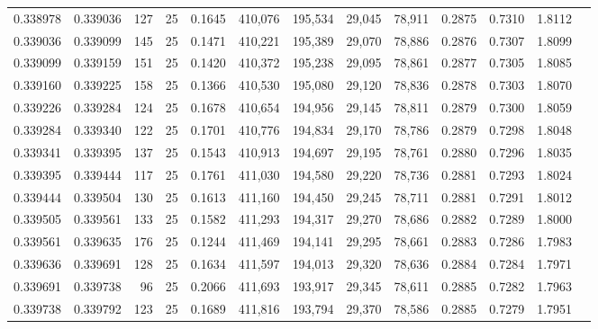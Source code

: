 \begin{tabular}{rrrrrrrrrrrrr}
0.338978 & 0.339036 &   127 &  25 &                                     0.1645 & 410,076 & 195,534 &  29,045 &  78,911 & 0.2875 & 0.7310 & 1.8112 \\
0.339036 & 0.339099 &   145 &  25 &                                     0.1471 & 410,221 & 195,389 &  29,070 &  78,886 & 0.2876 & 0.7307 & 1.8099 \\
0.339099 & 0.339159 &   151 &  25 &                                     0.1420 & 410,372 & 195,238 &  29,095 &  78,861 & 0.2877 & 0.7305 & 1.8085 \\
0.339160 & 0.339225 &   158 &  25 &                                     0.1366 & 410,530 & 195,080 &  29,120 &  78,836 & 0.2878 & 0.7303 & 1.8070 \\
0.339226 & 0.339284 &   124 &  25 &                                     0.1678 & 410,654 & 194,956 &  29,145 &  78,811 & 0.2879 & 0.7300 & 1.8059 \\
0.339284 & 0.339340 &   122 &  25 &                                     0.1701 & 410,776 & 194,834 &  29,170 &  78,786 & 0.2879 & 0.7298 & 1.8048 \\
0.339341 & 0.339395 &   137 &  25 &                                     0.1543 & 410,913 & 194,697 &  29,195 &  78,761 & 0.2880 & 0.7296 & 1.8035 \\
0.339395 & 0.339444 &   117 &  25 &                                     0.1761 & 411,030 & 194,580 &  29,220 &  78,736 & 0.2881 & 0.7293 & 1.8024 \\
0.339444 & 0.339504 &   130 &  25 &                                     0.1613 & 411,160 & 194,450 &  29,245 &  78,711 & 0.2881 & 0.7291 & 1.8012 \\
0.339505 & 0.339561 &   133 &  25 &                                     0.1582 & 411,293 & 194,317 &  29,270 &  78,686 & 0.2882 & 0.7289 & 1.8000 \\
0.339561 & 0.339635 &   176 &  25 &                                     0.1244 & 411,469 & 194,141 &  29,295 &  78,661 & 0.2883 & 0.7286 & 1.7983 \\
0.339636 & 0.339691 &   128 &  25 &                                     0.1634 & 411,597 & 194,013 &  29,320 &  78,636 & 0.2884 & 0.7284 & 1.7971 \\
0.339691 & 0.339738 &    96 &  25 &                                     0.2066 & 411,693 & 193,917 &  29,345 &  78,611 & 0.2885 & 0.7282 & 1.7963 \\
0.339738 & 0.339792 &   123 &  25 &                                     0.1689 & 411,816 & 193,794 &  29,370 &  78,586 & 0.2885 & 0.7279 & 1.7951 \\

\end{tabular}
